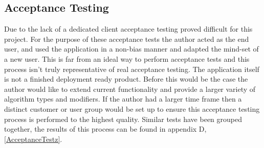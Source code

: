 \subsection{Acceptance Testing}

Due to the lack of a dedicated client acceptance testing proved difficult for this project. For the purpose of these acceptance tests the author acted as the end user, and used the application in a non-bias manner and adapted the mind-set of a new user. This is far from an ideal way to perform acceptance tests and this process isn’t truly representative of real acceptance testing. The application itself is not a finished deployment ready product. Before this would be the case the author would like to extend current functionality and provide a larger variety of algorithm types and modifiers. If the author had a larger time frame then a distinct customer or user group would be set up to ensure this acceptance testing process is performed to the highest quality. Similar tests have been grouped together, the results of this process can be found in appendix D, \ref{AcceptanceTestz}.